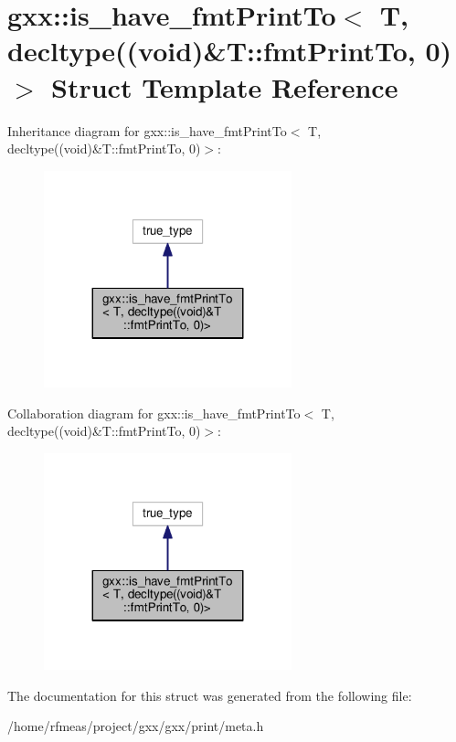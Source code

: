 \hypertarget{structgxx_1_1is__have__fmtPrintTo_3_01T_00_01decltype_07_07void_08_6T_1_1fmtPrintTo_00_010_08_4}{}\section{gxx\+:\+:is\+\_\+have\+\_\+fmt\+Print\+To$<$ T, decltype((void)\&T\+:\+:fmt\+Print\+To, 0)$>$ Struct Template Reference}
\label{structgxx_1_1is__have__fmtPrintTo_3_01T_00_01decltype_07_07void_08_6T_1_1fmtPrintTo_00_010_08_4}


Inheritance diagram for gxx\+:\+:is\+\_\+have\+\_\+fmt\+Print\+To$<$ T, decltype((void)\&T\+:\+:fmt\+Print\+To, 0)$>$\+:
\nopagebreak
\begin{figure}[H]
\begin{center}
\leavevmode
\includegraphics[width=203pt]{structgxx_1_1is__have__fmtPrintTo_3_01T_00_01decltype_07_07void_08_6T_1_1fmtPrintTo_00_010_08_4__inherit__graph}
\end{center}
\end{figure}


Collaboration diagram for gxx\+:\+:is\+\_\+have\+\_\+fmt\+Print\+To$<$ T, decltype((void)\&T\+:\+:fmt\+Print\+To, 0)$>$\+:
\nopagebreak
\begin{figure}[H]
\begin{center}
\leavevmode
\includegraphics[width=203pt]{structgxx_1_1is__have__fmtPrintTo_3_01T_00_01decltype_07_07void_08_6T_1_1fmtPrintTo_00_010_08_4__coll__graph}
\end{center}
\end{figure}


The documentation for this struct was generated from the following file\+:\begin{DoxyCompactItemize}
\item 
/home/rfmeas/project/gxx/gxx/print/meta.\+h\end{DoxyCompactItemize}
